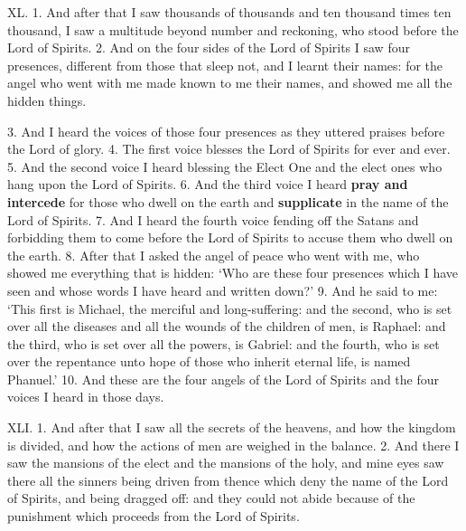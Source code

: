 
XL. 1. And after that I saw thousands of thousands
and ten thousand times ten thousand, I saw a multitude
beyond number and reckoning, who stood before
the Lord of Spirits. 2. And on the four sides of
the Lord of Spirits I saw four presences, different
from those that sleep not, and I learnt their names:
for the angel who went with me made known to me
their names, and showed me all the hidden things.

3. And I heard the voices of those four presences
as they uttered praises before the Lord of glory.
4. The first voice blesses the Lord of Spirits for ever
and ever. 5. And the second voice I heard blessing
the Elect One and the elect ones who hang upon the
Lord of Spirits. 6. And the third voice I heard
\textbf{pray and intercede} for those who dwell on the earth
and \textbf{supplicate} in the name of the Lord of Spirits.
7. And I heard the fourth voice fending off the Satans
and forbidding them to come before the Lord of
Spirits to accuse them who dwell on the earth.
8. After that I asked the angel of peace who went
with me, who showed me everything that is hidden:
‘Who are these four presences which I have seen
and whose words I have heard and written down?’
9. And he said to me: ‘This first is Michael, the
merciful and long-suffering: and the second, who
is set over all the diseases and all the wounds of the
children of men, is Raphael: and the third, who is
set over all the powers, is Gabriel: and the fourth,
who is set over the repentance unto hope of those
who inherit eternal life, is named Phanuel.’ 10. And
these are the four angels of the Lord of Spirits and the
four voices I heard in those days.

XLI. 1. And after that I saw all the secrets of the
heavens, and how the kingdom is divided, and how
the actions of men are weighed in the balance.
2. And there I saw the mansions of the elect and
the mansions of the holy, and mine eyes saw there
all the sinners being driven from thence which deny
the name of the Lord of Spirits, and being dragged
off: and they could not abide because of the punishment
which proceeds from the Lord of Spirits.


